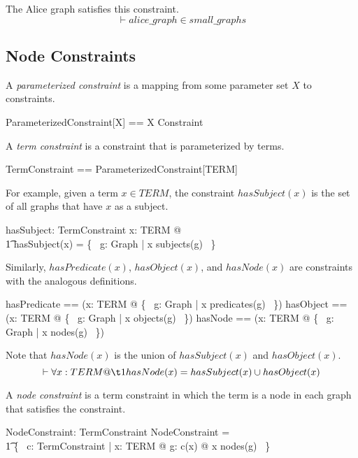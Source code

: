 \documentclass{article}
\begin{document}
The Alice graph satisfies this constraint.
\[\vdash
	alice\_graph \in small\_graphs
\]

\subsection{Node Constraints}

A {\em parameterized constraint} is a mapping from 
some parameter set $X$ to constraints.
\begin{zed}
	ParameterizedConstraint[X] == X \fun Constraint
\end{zed}

A {\em term constraint} is a constraint that is parameterized by terms.
\begin{zed}
	TermConstraint == ParameterizedConstraint[TERM]
\end{zed}

For example, given a term $x \in TERM$, the constraint $hasSubject(x)$ is the set of all graphs that have $x$ as a subject.
\begin{axdef}
	hasSubject: TermConstraint
\where
\forall x: TERM @ \\
\t1	hasSubject(x) = \{~ g: Graph | x \in subjects(g) ~\}
\end{axdef}

Similarly, $hasPredicate(x)$, $hasObject(x)$, and $hasNode(x)$ are constraints with the analogous definitions.
\begin{zed}
	hasPredicate == (\lambda x: TERM @ \{~ g: Graph | x \in predicates(g) ~\})
\also
	hasObject == (\lambda x: TERM @ \{~ g: Graph | x \in objects(g) ~\})
\also
	hasNode == (\lambda x: TERM @ \{~ g: Graph | x \in nodes(g) ~\})
\end{zed}

Note that $hasNode(x)$ is the union of $hasSubject(x)$ and $hasObject(x)$.
\[\vdash 
	\forall x: TERM @ \\
\t1		hasNode(x) = hasSubject(x) \cup hasObject(x)
\]

A {\em node constraint} is a term constraint in which the term is a node in each graph that satisfies the constraint.
\begin{axdef}
	NodeConstraint: \power TermConstraint
\where
	NodeConstraint = \\
\t1 \{~ c: TermConstraint | \forall x: TERM @ \forall g: c(x) @ x \in nodes(g) ~\}
\end{axdef}
\end{document}
